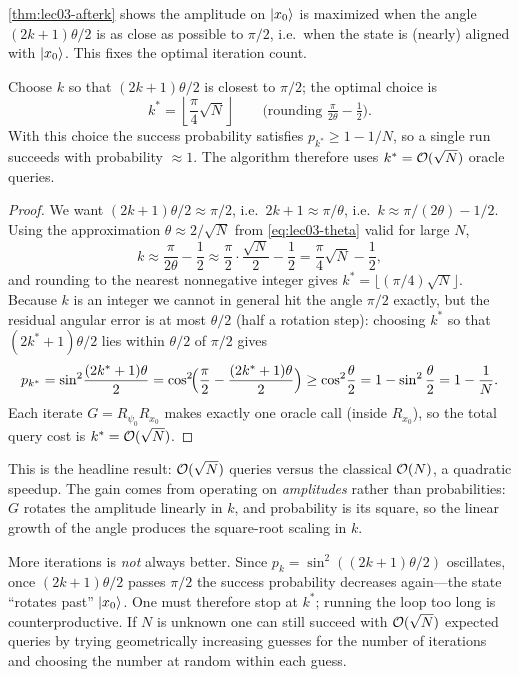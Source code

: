 \cref{thm:lec03-afterk} shows the amplitude on $\ket{x_0}$ is maximized when the
angle $(2k+1)\theta/2$ is as close as possible to $\pi/2$, i.e.\ when the state is
(nearly) aligned with $\ket{x_0}$. This fixes the optimal iteration count.

\begin{theorem}
\label{thm:lec03-kstar}
Choose $k$ so that $(2k+1)\theta/2$ is closest to $\pi/2$; the optimal choice is
\[
  k^{\ast}=\left\lfloor\frac{\pi}{4}\sqrt N\right\rfloor
  \qquad\bigl(\text{rounding } \tfrac{\pi}{2\theta}-\tfrac12\bigr).
\]
With this choice the success probability satisfies $p_{k^{\ast}}\ge 1-1/N$, so a
single run succeeds with probability $\approx1$. The algorithm therefore uses
$k^{\ast}=\mathcal{O}(\sqrt N)$ oracle queries.
\end{theorem}

\begin{proof}
We want $(2k+1)\theta/2\approx\pi/2$, i.e.\ $2k+1\approx\pi/\theta$, i.e.\
$k\approx\pi/(2\theta)-1/2$. Using the approximation $\theta\approx2/\sqrt N$ from
\eqref{eq:lec03-theta} valid for large $N$,
\[
  k\approx\frac{\pi}{2\theta}-\frac12\approx\frac{\pi}{2}\cdot\frac{\sqrt N}{2}-\frac12
     =\frac{\pi}{4}\sqrt N-\frac12,
\]
and rounding to the nearest nonnegative integer gives
$k^{\ast}=\lfloor(\pi/4)\sqrt N\rfloor$. Because $k$ is an integer we cannot in
general hit the angle $\pi/2$ exactly, but the residual angular error is at most
$\theta/2$ (half a rotation step): choosing $k^{\ast}$ so that
$(2k^{\ast}+1)\theta/2$ lies within $\theta/2$ of $\pi/2$ gives
\[
  p_{k^{\ast}}=\sin^{2}\!\frac{(2k^{\ast}+1)\theta}{2}
    =\cos^{2}\!\Bigl(\frac{\pi}{2}-\frac{(2k^{\ast}+1)\theta}{2}\Bigr)
    \ge\cos^{2}\!\frac{\theta}{2}=1-\sin^{2}\frac{\theta}{2}=1-\frac1N.
\]
Each iterate $G=R_{\psi_0}R_{x_0}$ makes exactly one oracle call (inside
$R_{x_0}$), so the total query cost is $k^{\ast}=\mathcal{O}(\sqrt N)$.
\end{proof}

This is the headline result: $\mathcal{O}(\sqrt N)$ queries versus the classical
$\mathcal{O}(N)$, a quadratic speedup. The gain comes from operating on \emph{amplitudes}
rather than probabilities: $G$ rotates the amplitude linearly in $k$, and
probability is its square, so the linear growth of the angle produces the
square-root scaling in $k$.

\begin{remark}
\label{rem:lec03-overrotate}
More iterations is \emph{not} always better. Since
$p_k=\sin^{2}((2k+1)\theta/2)$ oscillates, once $(2k+1)\theta/2$ passes $\pi/2$ the
success probability decreases again---the state ``rotates past'' $\ket{x_0}$. One
must therefore stop at $k^{\ast}$; running the loop too long is counterproductive.
If $N$ is unknown one can still succeed with $\mathcal{O}(\sqrt N)$ expected queries by
trying geometrically increasing guesses for the number of iterations and choosing
the number at random within each guess.
\end{remark}


